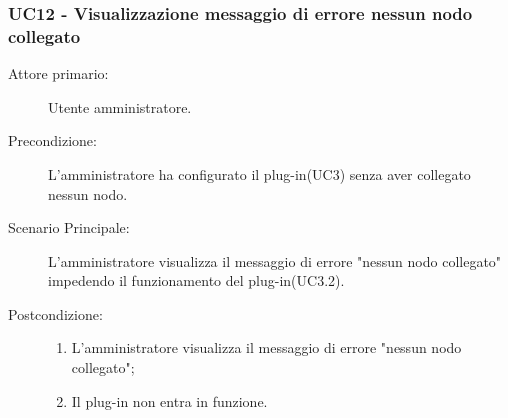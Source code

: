 \subsubsection{UC12 - Visualizzazione messaggio di errore nessun nodo collegato}
\label{sssec:uc12}
\begin{description}
	\item[Attore primario:] Utente amministratore.
	\item[Precondizione:] L'amministratore ha configurato il plug-in(UC3) senza aver collegato nessun nodo.
	\item[Scenario Principale:] L'amministratore visualizza il messaggio di errore "nessun nodo collegato" impedendo il funzionamento del plug-in(UC3.2).
	\item[Postcondizione:]
	\begin{enumerate}
		\item L'amministratore visualizza il messaggio di errore "nessun nodo collegato";
		\item Il plug-in non entra in funzione.
	\end{enumerate}
\end{description}
